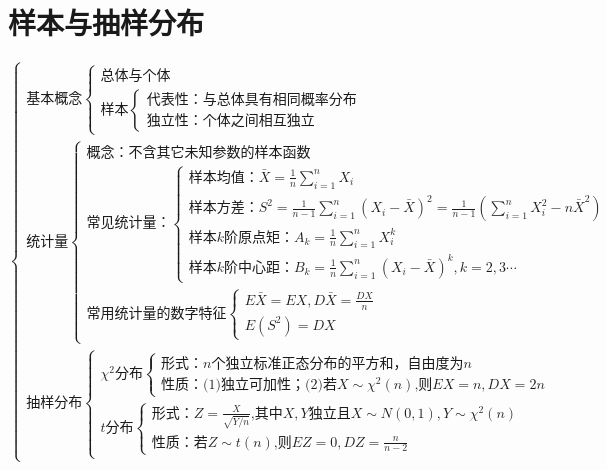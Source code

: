 \documentclass[lang=cn,11pt]{elegantbook}
\begin{document}
\chapter{样本与抽样分布}

\[
\begin{cases}
\text{基本概念}
\begin{cases}
\text{总体与个体} \\
\text{样本}
\begin{cases}
\text{代表性：与总体具有相同概率分布} \\
\text{独立性：个体之间相互独立}
\end{cases}
\end{cases} \\[6pt]
\text{统计量}
\begin{cases}
\text{概念：不含其它未知参数的样本函数} \\[6pt]
\text{常见统计量：}
\begin{cases}
\text{样本均值：}\bar{X}=\displaystyle\frac{1}{n}\sum_{i=1}^n X_i \\[6pt]
\text{样本方差：}S^2=\displaystyle\frac{1}{n-1}\sum_{i=1}^n (X_i-\bar{X})^2=\frac{1}{n-1}\left(\sum_{i=1}^n X_i^2-n\bar{X}^2\right) \\[6pt]
\text{样本}k\text{阶原点矩：}A_k=\displaystyle\frac{1}{n}\sum_{i=1}^n X_i^k \\[6pt]
\text{样本}k\text{阶中心距：}B_k=\displaystyle\frac{1}{n}\sum_{i=1}^n (X_i-\bar{X})^k,k=2,3\cdots
\end{cases} \\[6pt]
\text{常用统计量的数字特征}
\begin{cases}
E\bar{X}=EX,D\bar{X}=\displaystyle\frac{DX}{n} \\[6pt]
E(S^2)=DX
\end{cases}
\end{cases} \\[6pt]
\text{抽样分布}
\begin{cases}
\chi^2\text{分布}
\begin{cases}
\text{形式：}n\text{个独立标准正态分布的平方和，自由度为}n \\[6pt]
\text{性质：(1)独立可加性；(2)若}X\sim\chi^2(n)\text{,则}EX=n,DX=2n
\end{cases} \\[6pt]
t\text{分布}
\begin{cases}
\text{形式：}Z=\displaystyle\frac{X}{\sqrt{Y/n}}\text{,其中}X,Y\text{独立且}X\sim N(0,1),Y\sim\chi^2(n) \\[6pt]
\text{性质：若}Z\sim t(n)\text{,则}EZ=0,DZ=\displaystyle\frac{n}{n-2}

\end{cases}
\end{cases}
\end{cases}\]
\end{document}

